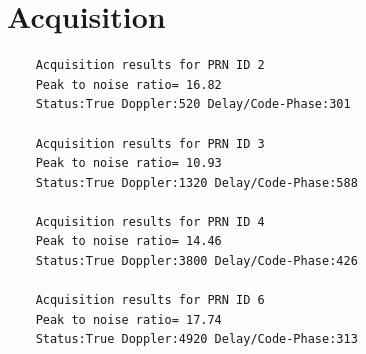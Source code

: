 \section{Acquisition}

\begin{lstlisting}
    Acquisition results for PRN ID 2
	Peak to noise ratio= 16.82
 	Status:True Doppler:520 Delay/Code-Phase:301
	
	Acquisition results for PRN ID 3
	Peak to noise ratio= 10.93
 	Status:True Doppler:1320 Delay/Code-Phase:588
	
	Acquisition results for PRN ID 4
	Peak to noise ratio= 14.46
 	Status:True Doppler:3800 Delay/Code-Phase:426
	
	Acquisition results for PRN ID 6
	Peak to noise ratio= 17.74
 	Status:True Doppler:4920 Delay/Code-Phase:313
\end{lstlisting}
\newpage
